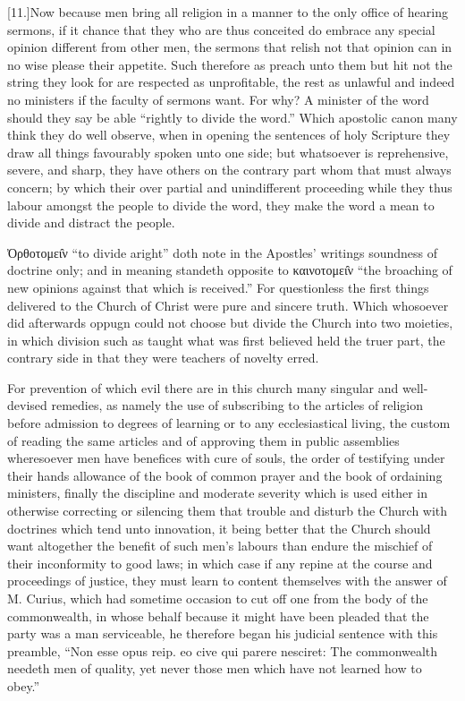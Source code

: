 [11.]Now because men bring all religion in a manner to the only office of hearing sermons, if it chance that they who are thus conceited do embrace any special opinion different from other men, the sermons that relish not that opinion can in no wise please their appetite. Such therefore as preach unto them but hit not the string they look for are respected  as unprofitable, the rest as unlawful and indeed no ministers if the faculty of sermons want. For why? A minister of the word should they say be able “rightly to divide the word.” Which apostolic canon many think they do well observe, when in opening the sentences of holy Scripture they draw all things favourably spoken unto one side; but whatsoever is reprehensive, severe, and sharp, they have others on the contrary part whom that must always concern; by which their over partial and unindifferent proceeding while they thus labour amongst the people to divide the word, they make the word a mean to divide and distract the people.

Ὀρθοτομει̑ν “to divide aright” doth note in the Apostles’ writings soundness of doctrine only; and in meaning standeth opposite to καινοτομει̑ν “the broaching of new opinions against that which is received.” For questionless the first things delivered to the Church of Christ were pure and sincere truth. Which whosoever did afterwards oppugn could not choose but divide the Church into two moieties, in which division such as taught what was first believed held the truer part, the contrary side in that they were teachers of novelty erred.

For prevention of which evil there are in this church many singular and well-devised remedies, as namely the use of subscribing to the articles of religion before admission to degrees of learning or to any ecclesiastical living, the custom of reading the same articles and of approving them in public assemblies wheresoever men have benefices with cure of souls, the order of testifying under their hands allowance of the book of common prayer and the book of ordaining ministers, finally the discipline and moderate severity which is used either in otherwise correcting or silencing them that trouble and disturb the Church with doctrines which tend unto innovation, it being better that the Church should want altogether the benefit of such men’s labours than endure the mischief of their inconformity to good laws; in which case if any repine at the course and proceedings of justice, they must learn to content themselves with the answer of M. Curius,  which had sometime occasion to cut off one from the body of the commonwealth,
 in whose behalf because it might have been pleaded that the party was a man serviceable, he therefore began his judicial sentence with this preamble, “Non esse opus reip. eo cive qui parere nesciret: The commonwealth needeth men of quality, yet never those men which have not learned how to obey.”

